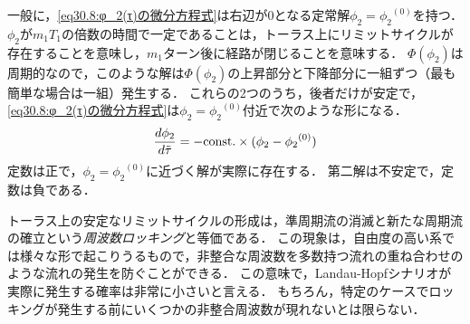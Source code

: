 一般に，\eqref{eq30.8:φ_2(τ)の微分方程式}は右辺が0となる定常解$\phi_2={\phi_2}^{(0)}$を持つ．
$\phi_2$が$m_1T_1$の倍数の時間で一定であることは，トーラス上にリミットサイクルが存在することを意味し，$m_1$ターン後に経路が閉じることを意味する．
$\Phi(\phi_2)$は周期的なので，このような解は$\Phi(\phi_2)$の上昇部分と下降部分に一組ずつ（最も簡単な場合は一組）発生する．
これらの2つのうち，後者だけが安定で，\eqref{eq30.8:φ_2(τ)の微分方程式}は$\phi_2={\phi_2}^{(0)}$付近で次のような形になる．
\[
    \dv{\phi_2}{\tilde{\tau}} = -\mathrm{const.} \times (\phi_2 - {\phi_2}^{(0)})
\]
定数は正で，$\phi_2={\phi_2}^{(0)}$に近づく解が実際に存在する．
第二解は不安定で，定数は負である．




トーラス上の安定なリミットサイクルの形成は，準周期流の消滅と新たな周期流の確立という\emph{周波数ロッキング}と等価である．
この現象は，自由度の高い系では様々な形で起こりうるもので，非整合な周波数を多数持つ流れの重ね合わせのような流れの発生を防ぐことができる．
この意味で，Landau-Hopfシナリオが実際に発生する確率は非常に小さいと言える．
もちろん，特定のケースでロッキングが発生する前にいくつかの非整合周波数が現れないとは限らない．




\BackToTheToc